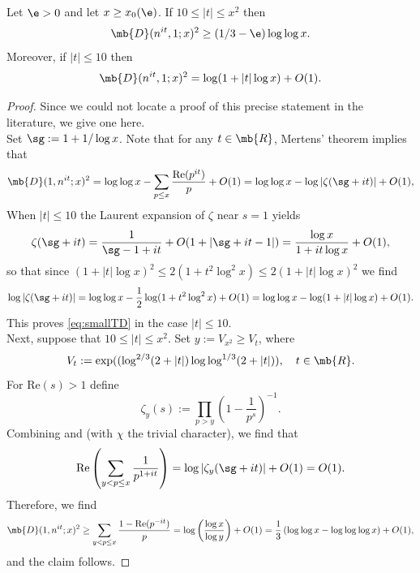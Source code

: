 \begin{lem} \label{lem:nitTo1}
Let $\e > 0$ and let $x \geq x_0(\e)$. If $10 \leq |t| \leq x^2$ then
\begin{equation}\label{eq:largeTD}
\mb{D}(n^{it},1;x)^2 \geq (1/3-\e) \log\log x.
\end{equation}
Moreover, if $|t| \leq 10$ then
\begin{equation}\label{eq:smallTD}
\mb{D}(n^{it},1;x)^2 = \log(1+|t|\log x) + O(1).
\end{equation}
\end{lem}
\begin{proof}
Since we could not locate a proof of this precise statement in the literature, we give one here. \\
Set $\sg := 1 + 1/\log x$. Note that for any $t \in \mb{R}$, Mertens' theorem implies that
$$
\mb{D}(1,n^{it};x)^2 = \log\log x - \sum_{p \leq x} \frac{\text{Re}(p^{it})}{p} + O(1) = \log\log x - \log|\zeta(\sg + it)| + O(1),
$$
When $|t| \leq 10$ the Laurent expansion of $\zeta$ near $s = 1$ yields
%
$$
\zeta(\sg + it) = \frac{1}{\sg-1 + it} + O(1+|\sg + it-1|) = \frac{\log x}{1 + it\log x} + O(1),
%
$$
so that since $(1+|t| \log x)^2 \leq 2(1+t^2\log^2 x) \leq 2(1+|t| \log x)^2$ we find
$$
\log|\zeta(\sg+it)|  = \log\log x - \frac{1}{2}\log(1+t^2\log^2 x) + O(1) = \log\log x - \log(1+|t|\log x) + O(1).
$$
This proves \eqref{eq:smallTD} in the case $|t| \leq 10$. \\
Next, suppose that $10 \leq |t| \leq x^2$. Set $y := V_{x^2} \geq V_t$, where
$$
V_{t} := \exp((\log^{2/3}(2+|t|) \log\log^{1/3}(2+|t|)), \quad t \in \mb{R}.
$$
For $\text{Re}(s) > 1$ define
$$
\zeta_y(s) := \prod_{p > y} \left(1-\frac{1}{p^s}\right)^{-1}.
$$
Combining \cite[Lem. 3.2]{Kou} and \cite[Lem. 4.1]{Kou} (with $\chi$ the trivial character), we find that
$$
\text{Re}\left(\sum_{y < p \leq x} \frac{1}{p^{1+it}}\right) = \log|\zeta_y(\sg + it)|  + O(1) = O(1).
$$
Therefore, we find
$$
\mb{D}(1,n^{it};x)^2 \geq \sum_{y < p \leq x} \frac{1-\text{Re}(p^{-it})}{p} = \log\left(\frac{\log x}{\log y}\right) + O(1) = \frac{1}{3}\left(\log\log x - \log\log\log x\right) + O(1),
$$
and the claim follows.
%
%
%
%
%
%
%
%
%
\end{proof}
%

